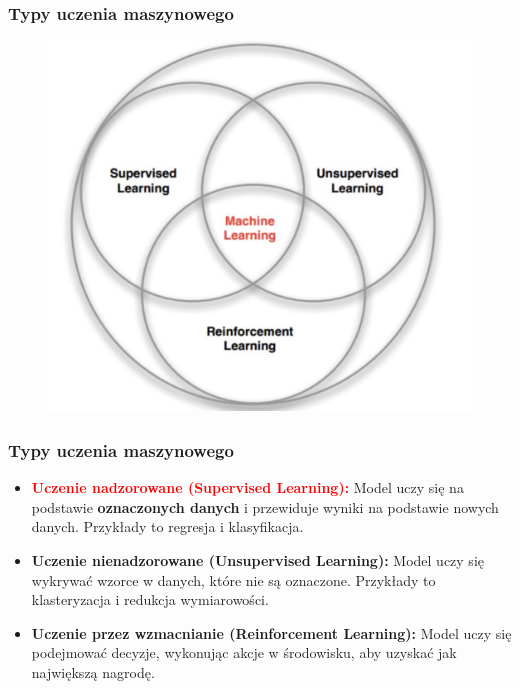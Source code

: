 \documentclass[smaller]{beamer}
\begin{document}
\begin{frame}
\frametitle{Typy uczenia maszynowego}
    \begin{figure}
        \centering
        \includegraphics[width=\textwidth,height=0.7\textheight,keepaspectratio]{../manifest/ml-types.png}
    \end{figure}
\end{frame}



\begin{frame}
\frametitle{Typy uczenia maszynowego}

\begin{itemize}
    \item \textbf{\textcolor{red}{Uczenie nadzorowane (Supervised Learning):}} Model uczy się na podstawie \textbf{oznaczonych danych} i przewiduje wyniki na podstawie nowych danych. Przykłady to regresja i klasyfikacja.
    \item \textbf{Uczenie nienadzorowane (Unsupervised Learning):} Model uczy się wykrywać wzorce w danych, które nie są oznaczone. Przykłady to klasteryzacja i redukcja wymiarowości.
    \item \textbf{Uczenie przez wzmacnianie (Reinforcement Learning):} Model uczy się podejmować decyzje, wykonując akcje w środowisku, aby uzyskać jak największą nagrodę. \faHeart
\end{itemize}

\end{frame}
\end{document}
